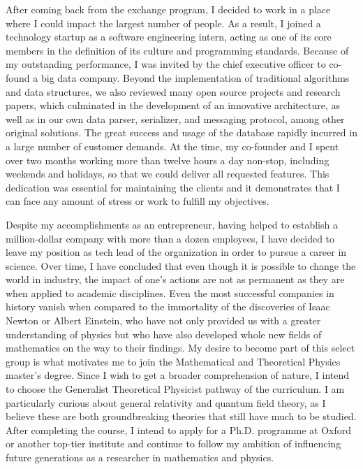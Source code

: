 \documentclass[10pt]{article}
\begin{document}
After coming back from the exchange program, I decided to work in a place where I could impact the largest number of people. As a result, I joined a technology startup as a software engineering intern, acting as one of its core members in the definition of its culture and programming standards. Because of my outstanding performance, I was invited by the chief executive officer to co-found a big data company. Beyond the implementation of traditional algorithms and data structures, we also reviewed many open source projects and research papers, which culminated in the development of an innovative architecture, as well as in our own data parser, serializer, and messaging protocol, among other original solutions. The great success and usage of the database rapidly incurred in a large number of customer demands. At the time, my co-founder and I spent over two months working more than twelve hours a day non-stop, including weekends and holidays, so that we could deliver all requested features. This dedication was essential for maintaining the clients and it demonstrates that I can face any amount of stress or work to fulfill my objectives.

Despite my accomplishments as an entrepreneur, having helped to establish a million-dollar company with more than a dozen employees, I have decided to leave my position as tech lead of the organization in order to pursue a career in science. Over time, I have concluded that even though it is possible to change the world in industry, the impact of one's actions are not as permanent as they are when applied to academic disciplines. Even the most successful companies in history vanish when compared to the immortality of the discoveries of Isaac Newton or Albert Einstein, who have not only provided us with a greater understanding of physics but who have also developed whole new fields of mathematics on the way to their findings. My desire to become part of this select group is what motivates me to join the Mathematical and Theoretical Physics master's degree. Since I wish to get a broader comprehension of nature, I intend to choose the Generalist Theoretical Physicist pathway of the curriculum. I am particularly curious about general relativity and quantum field theory, as I believe these are both groundbreaking theories that still have much to be studied. After completing the course, I intend to apply for a Ph.D. programme at Oxford or another top-tier institute and continue to follow my ambition of influencing future generations as a researcher in mathematics and physics.
\end{document}
